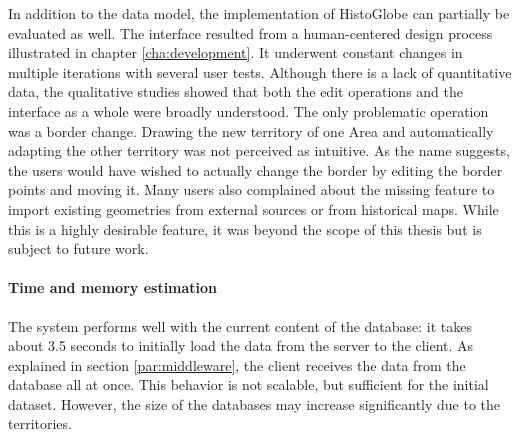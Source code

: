 In addition to the data model, the implementation of HistoGlobe can partially be evaluated as well. The interface resulted from a human-centered design process illustrated in chapter \ref{cha:development}. It underwent constant changes in multiple iterations with several user tests. Although there is a lack of quantitative data, the qualitative studies showed that both the edit operations and the interface as a whole were broadly understood. The only problematic operation was a border change. Drawing the new territory of one Area and automatically adapting the other territory was not perceived as intuitive. As the name suggests, the users would have wished to actually change the border by editing the border points and moving it. Many users also complained about the missing feature to import existing geometries from external sources or from historical maps. While this is a highly desirable feature, it was beyond the scope of this thesis but is subject to future work.

\paragraph{Time and memory estimation} %
\label{par:time_and_memory_estimation}

The system performs well with the current content of the database: it takes about 3.5 seconds to initially load the data from the server to the client. As explained in section \ref{par:middleware}, the client receives the data from the database all at once. This behavior is not scalable, but sufficient for the initial dataset. However, the size of the databases may increase significantly due to the territories.

